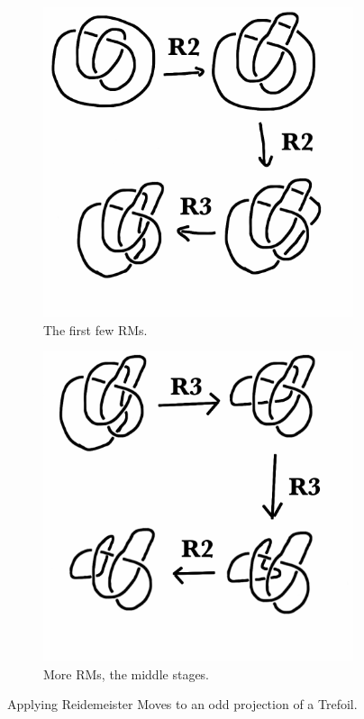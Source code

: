 \documentclass[12pt,letterpaper]{article}
\theoremstyle{definition}
\begin{document}
\begin{figure}[h]
    \centering
    \begin{subfigure}{.4\textwidth}
        \centering
        \includegraphics[width=\textwidth]{knotpics/trefoil-better1.png}
        \caption{The first few RMs.}
    \end{subfigure}
    \hspace{2cm}
    \begin{subfigure}{.4\textwidth}
        \centering
        \includegraphics[width=\textwidth]{knotpics/trefoil-better2.png}
        \caption{More RMs, the middle stages.}
     \end{subfigure}
     \caption{Applying Reidemeister Moves to an odd projection of a Trefoil.}
\end{figure}
\end{document}
